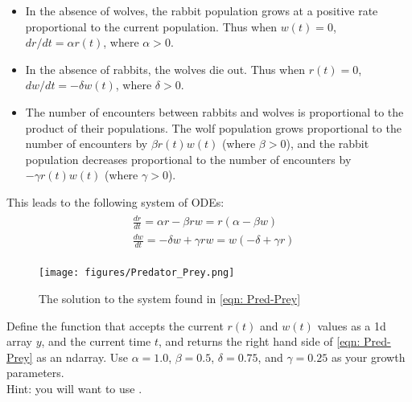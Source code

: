 \begin{itemize}
\item In the absence of wolves, the rabbit population grows at a positive rate proportional to the current population. Thus when $w(t) = 0$, $dr/dt = \alpha r(t)$, where $\alpha > 0$.
\item In the absence of rabbits, the wolves die out. Thus when $r(t) = 0$, $dw/dt = -\delta w(t)$, where $\delta > 0$.
\item The number of encounters between rabbits and wolves is proportional to the product of their populations. The wolf population grows proportional to the number of encounters by $\beta r(t)w(t)$ (where $\beta > 0$), and the rabbit population decreases proportional to the number of encounters by $-\gamma r(t)w(t)$ (where $\gamma > 0$). 
\end{itemize}

This leads to the following system of ODEs: 
\begin{align}
	\begin{split}
	&\frac{dr}{dt} = \alpha r - \beta r w = r(\alpha - \beta w)\\
	&\frac{dw}{dt} = -\delta w + \gamma r w = w(-\delta + \gamma r)
	\end{split}\label{eqn: Pred-Prey}
\end{align}

\begin{figure}[H]
\centering
\texttt{[image: figures/Predator\_Prey.png]}
\caption{The solution to the system found in \eqref{eqn: Pred-Prey}}
\label{fig: Pred-Prey}
\end{figure}


\begin{problem}
Define the function  that accepts the current $r(t)$ and $w(t)$ values as a 1d array $y$, and the current time $t$, 
and returns the right hand side of \eqref{eqn: Pred-Prey} as an ndarray. 
Use $\alpha=1.0$, $\beta=0.5$, $\delta=0.75$, and $\gamma=0.25$ as your growth parameters.\\
Hint: you will want to use .
%	

\end{problem}


